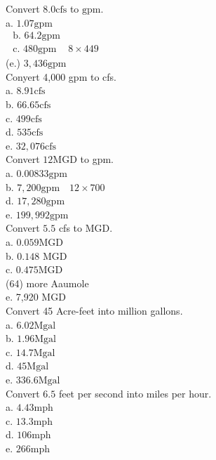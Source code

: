 Convert $8.0 \mathrm{cfs}$ to $\mathrm{gpm}$.\\
a. $1.07 \mathrm{gpm}$\\
$\begin{array}{ll}\text { b. } 64.2 \mathrm{gpm} \\ \text { c. } 480 \mathrm{gpm} & 8 \times 449\end{array}$\\
(e.) $3,436 \mathrm{gpm}$\\

Conyert 4,000 gpm to cfs.\\
a.  $8.91 \mathrm{cfs}$\\
b. $66.65 \mathrm{cfs}$\\
c. $499 \mathrm{cfs}$\\
d. $535 \mathrm{cfs}$\\
e. $32,076 \mathrm{cfs}$\\

Convert $12 \mathrm{MGD}$ to gpm.\\
a. $0.00833 \mathrm{gpm}$\\
b. $7,200 \mathrm{gpm} \quad 12 \times 700$\\
d. $17,280 \mathrm{gpm}$\\
e. $199,992 \mathrm{gpm}$\\

Convert $5.5$ cfs to MGD.\\
a. $0.059 \mathrm{MGD}$\\
b. $0.148$ MGD\\
c. $0.475 \mathrm{MGD}$\\
(64) more Aaumole\\
e. 7,920 MGD\\

Convert 45 Acre-feet into million gallons.\\
a. $6.02 \mathrm{Mgal}$\\
b. $1.96 \mathrm{Mgal}$\\
c.  $14.7 \mathrm{Mgal}$\\
d. $45 \mathrm{Mgal}$\\
e. $336.6 \mathrm{Mgal}$\\

Convert $6.5$ feet per second into miles per hour.\\
a.  $4.43 \mathrm{mph}$\\
c. $13.3 \mathrm{mph}$\\
d. $106 \mathrm{mph}$\\
e. $266 \mathrm{mph}$\\

